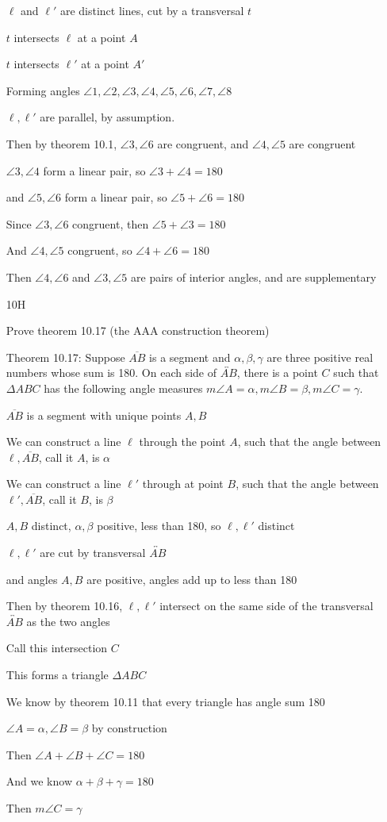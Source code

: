 \documentclass[11pt]{article}
\newcommand{\lines}[1]{\overleftrightarrow{#1}}
\newcommand{\segment}[1]{\overline{#1}}
\begin{document}
\begin{itemize}
		$\ell$ and $\ell'$ are distinct lines, cut by a transversal $t$

		$t$ intersects $\ell$ at a point $A$

		$t$ intersects $\ell'$ at a point $A'$

		Forming angles $\angle 1, \angle 2, \angle 3, \angle 4, \angle 5, \angle 6, \angle 7, \angle 8$

		$\ell, \ell'$ are parallel, by assumption.

		Then by theorem 10.1, $\angle 3, \angle 6$ are congruent, and $\angle 4, \angle 5$ are congruent

		$\angle 3, \angle 4$ form a linear pair, so $\angle 3 + \angle 4 = 180$

		and $\angle 5, \angle 6$ form a linear pair, so $\angle 5 + \angle 6 = 180$

		Since $\angle 3, \angle 6$ congruent, then $\angle 5 + \angle 3 = 180$

		And $\angle 4, \angle 5$ congruent, so $\angle 4 + \angle 6 = 180$

		Then $\angle 4, \angle 6$ and $\angle 3, \angle 5$ are pairs of interior angles, and are supplementary

	\item[10H]

		Prove theorem 10.17 (the AAA construction theorem)

		Theorem 10.17: Suppose $\segment{AB}$ is a segment and $\alpha, \beta, \gamma$ are three positive real numbers whose sum is 180. On each side of $\lines{AB}$, there is a point $C$ such that $\Delta ABC$ has the following angle measures $m \angle A = \alpha, m \angle B = \beta, m \angle C = \gamma$.
	
		$\segment{AB}$ is a segment with unique points $A,B$

		We can construct a line $\ell$ through the point $A$, such that the angle between $\ell, \segment{AB}$, call it $A$,  is $\alpha$

		We can construct a line $\ell'$ through at point $B$, such that the angle between $\ell', \segment{AB}$, call it $B$, is $\beta$

		$A, B$ distinct, $\alpha, \beta$ positive, less than 180, so  $\ell, \ell'$ distinct

		$\ell, \ell'$ are cut by transversal $\lines{AB}$

		and angles $A, B$ are positive, angles add up to less than 180

		Then by theorem 10.16, $\ell, \ell'$ intersect on the same side of the transversal $\lines{AB}$ as the two angles

		Call this intersection $C$

		This forms a triangle $\Delta ABC$

		We know by theorem 10.11 that every triangle has angle sum 180

		$\angle A = \alpha, \angle B = \beta$ by construction

		Then $\angle A + \angle B + \angle C = 180$

		And we know $\alpha + \beta + \gamma = 180$

		Then $m \angle C = \gamma$

\end{itemize}
\end{document}
